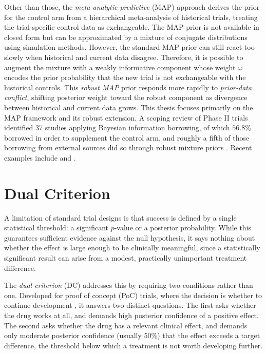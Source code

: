 Other than those, the \textit{meta-analytic-predictive} (MAP) approach \citep{neuenschwander2010summarizing} derives the prior for the control arm
from a hierarchical meta-analysis of historical trials, treating the trial-specific control data as exchangeable. The MAP prior is
not available in closed form but can be approximated by a mixture of conjugate distributions using simulation methods. However, the standard 
MAP prior can still react too slowly when historical and current data disagree. Therefore, it is possible to augment the mixture with a weakly informative
component whose weight $\omega$ encodes the prior probability that the new trial is not exchangeable with the historical controls.
This \textit{robust MAP} prior \citep{schmidli_robust_2014} responds more rapidly to \textit{prior-data conflict}, shifting posterior weight toward the robust component as
divergence between historical and current data grows. This thesis focuses primarily on the MAP framework and its robust extension. A scoping review of Phase II trials identified 37 studies applying
Bayesian information borrowing, of which $56.8\%$ borrowed in order to supplement the control arm, and roughly a fifth of those
borrowing from external sources did so through robust mixture priors \citep{weru2026uptake}. Recent examples include
\citet{richeldi2022trial} and \citet{chen2024efficacy}.


\section{Dual Criterion} 
\label{subsec:dual_criterion_intro}

A limitation of standard trial designs is that success is defined by a single statistical threshold: a significant $p$-value or a posterior probability. While this guarantees sufficient evidence against the null hypothesis, 
it says nothing about whether the effect is large enough to be clinically meaningful, since a statistically significant result can arise from a modest, practically unimportant treatment difference.

The \textit{dual criterion} (DC) addresses this by requiring two conditions rather than one. Developed for proof of concept (PoC)
trials, where the decision is whether to continue development \citep{gsponer_practical_2014, fisch2015bayesian, walley2015advantages}, it
answers two distinct questions. The first asks whether the drug works at all, and demands high posterior confidence of a positive effect. The second asks whether the drug has a relevant clinical effect, and demands only moderate
posterior confidence (usually 50\%) that the effect exceeds a target difference, the threshold below which a treatment is not worth developing further. 

